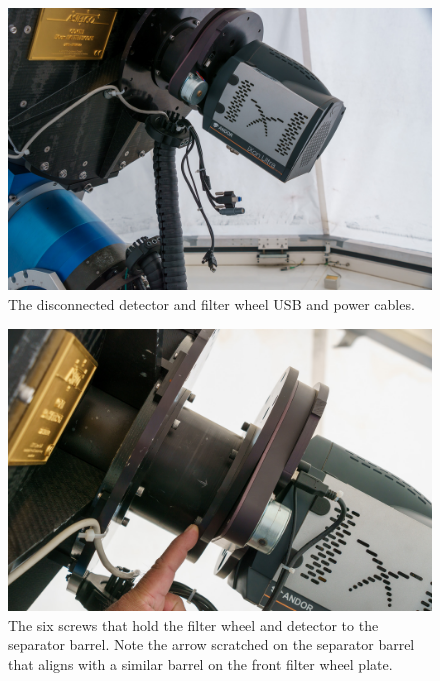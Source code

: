 \begin{figure}
\begin{center}
\includegraphics[width=0.8\linewidth]{figures/huitzi-f8-cables-disconnected.jpg}
\end{center}
\caption{The disconnected detector and filter wheel USB and power cables.}
\label{figure:huitzi-f8-cables-disconnected}
\end{figure}

\begin{figure}
\begin{center}
\includegraphics[width=0.8\linewidth]{figures/huitzi-f8-mounting-screws.jpg}
\end{center}
\caption{The six screws that hold the filter wheel and detector to the separator barrel. Note the arrow scratched on the separator barrel that aligns with a similar barrel on the front filter wheel plate.}
\label{figure:huitzi-f8-mounting-screws}
\end{figure}

